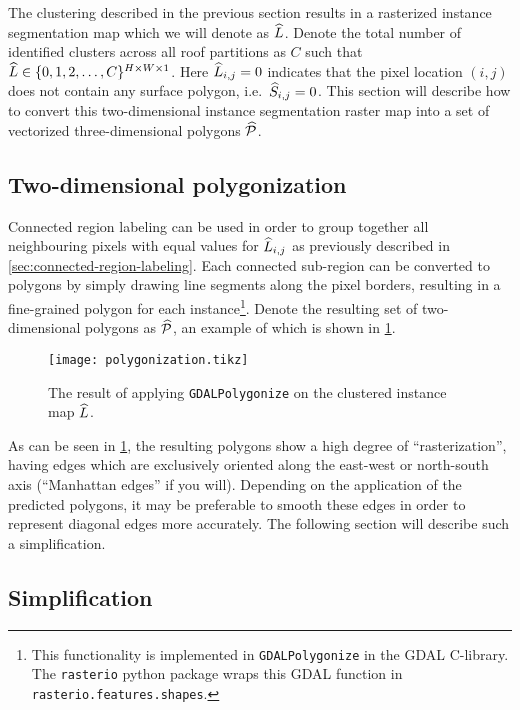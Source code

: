 The clustering described in the previous section results in a rasterized instance segmentation map which we will denote as $\widehat{L}$.
Denote the total number of identified clusters across all roof partitions as $C$ such that $\widehat{L} \in \{0, 1, 2, \ldots, C\}^{H \times W \times 1}$.
Here $\widehat{L}_{i,j} = 0$ indicates that the pixel location $(i,j)$ does not contain any surface polygon, i.e.\ $\widehat{S}_{i,j} = 0$.
This section will describe how to convert this two-dimensional instance segmentation raster map into a set of vectorized three-dimensional polygons $\widehat{\mathcal{P}}$.

\subsection{Two-dimensional polygonization}

Connected region labeling can be used in order to group together all neighbouring pixels with equal values for $\widehat{L}_{i,j}$ as previously described in \cref{sec:connected-region-labeling}.
Each connected sub-region can be converted to polygons by simply drawing line segments along the pixel borders, resulting in a fine-grained polygon for each instance\footnote{This functionality is implemented in \texttt{GDALPolygonize} in the GDAL C-library. The \texttt{rasterio} python package wraps this GDAL function in \texttt{rasterio.features.shapes}.}.
Denote the resulting set of two-dimensional polygons as $\widehat{\mathcal{P}}$, an example of which is shown in \cref{fig:polygonization}.
\begin{figure}[H]
  \centering
  \texttt{[image: polygonization.tikz]}
  \caption{The result of applying \texttt{GDALPolygonize} on the clustered instance map $\widehat{L}$.}%
  \label{fig:polygonization}
\end{figure}
\noindent
As can be seen in \cref{fig:polygonization}, the resulting polygons show a high degree of \enquote{rasterization}, having edges which are exclusively oriented along the east-west or north-south axis (\enquote{Manhattan edges} if you will).
Depending on the application of the predicted polygons, it may be preferable to smooth these edges in order to represent diagonal edges more accurately.
The following section will describe such a simplification.
\newpage

\subsection{Simplification}%
\label{sec:simplification}

